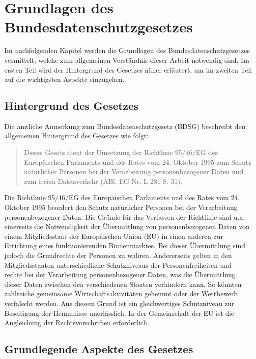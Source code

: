 \chapter{Grundlagen des Bundesdatenschutzgesetzes}
Im nachfolgenden Kapitel werden die Grundlagen des Bundesdatenschutzgesetzes vermittelt, welche zum allgemeinen Verständnis dieser Arbeit notwendig sind. Im ersten Teil wird der Hintergrund des Gesetzes näher erläutert, um im zweiten Teil auf  die wichtigsten Aspekte einzugehen.
\section{Hintergrund des Gesetzes}
Die amtliche Anmerkung zum Bundesdatenschutzgesetz (\acs{BDSG}) beschreibt den allgemeinen Hintergrund des Gesetzes wie folgt:
\begin{quote}
\glqq Dieses Gesetz dient der Umsetzung der Richtlinie 95/46/EG des Europäischen Parlaments und des Rates vom 24. Oktober 1995 zum Schutz natürlicher Personen bei der Verarbeitung personenbezogener Daten und zum freien Datenverkehr (ABl. EG Nr. L 281 S. 31).\grqq \autocite[][]{DeJureBDSG}
\end{quote}
Die Richtlinie 95/46/EG des Europäischen Parlaments und des Rates vom 24. Oktober 1995 beordert den Schutz natürlicher Personen bei der Verarbeitung personenbezogener Daten. Die Gründe für das Verfassen der Richtlinie sind u.a. einerseits die Notwendigkeit der Übermittlung von personenbezogenen Daten von einem Mitgliedsstaat der Europäischen Union (\acs{EU}) in einen anderen zur Errichtung eines funktionierenden Binnenmarktes. Bei dieser Übermittlung sind jedoch die Grundrechte der Personen zu wahren. Andererseits gelten in den Mitgliedsstaaten unterschiedliche Schutzniveaus der Personenfreiheiten und -rechte bei der Verarbeitung personenbezogener Daten, was die Übermittlung dieser Daten zwischen den verschiedenen Staaten verhindern kann. So könnten zahlreiche gemeinsame Wirtschaftsaktivitäten gehemmt oder der Wettbewerb verfälscht werden. Aus diesem Grund ist ein gleichwertiges Schutzniveau zur Beseitigung der Hemmnisse unerlässlich. In der Gemeinschaft der EU ist die Angleichung der Rechtsvorschriften erforderlich.\autocite[vgl.][]{EU.1995}\\
\section{Grundlegende Aspekte des Gesetzes}
